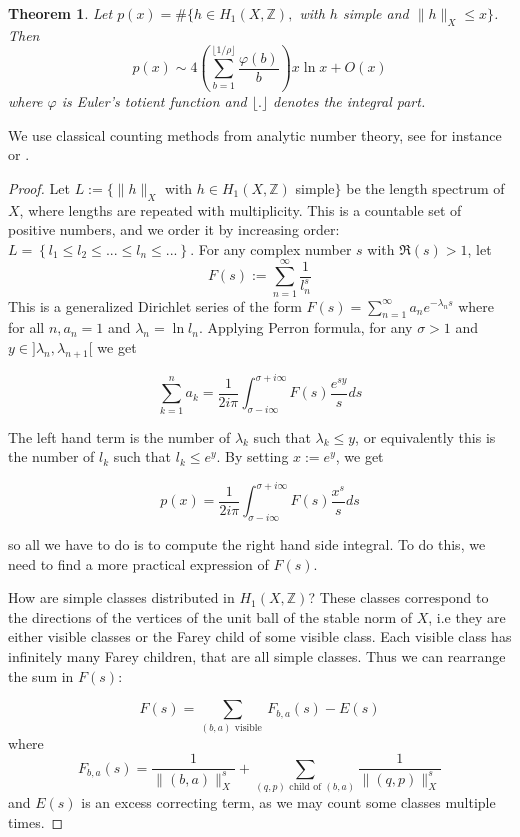\documentclass{article}
\newcommand{\ZZ}{\mathbb{Z}}
\newcommand{\St}[1]{\|#1\|_X}
\newtheorem{thm}{Theorem}[section]
\theoremstyle{definition}
\begin{document}
\begin{thm}
    Let $p(x)= \#  \{ h \in H_1(X,\ZZ),$ with $h$ simple and $\St{h}\le x \}$. Then
    $$p(x) \sim 4 \left(\sum_{b=1}^{\lfloor 1/\rho \rfloor} \frac{\varphi(b)}{b}\right )  x \ln x + O(x)$$
    where $\varphi$ is Euler's totient function and $\lfloor . \rfloor$ denotes the integral part.
\end{thm}

We use classical counting methods from analytic number theory, see for instance \cite{Apostol} or \cite{Tenenbaum}.


\begin{proof}
Let $L :=  \{ \St{h}$ with $h\in H_1(X,\ZZ)$ simple$ \}$ be the length spectrum of $X$, where lengths are repeated with multiplicity. This is a countable set of positive numbers, and we order it by increasing order: $L = \left \{ l_1 \le l_2 \le ... \le l_n \le ... \right \}$. For any complex number $s$ with $\Re(s) > 1$, let 
$$F(s):= \sum_{n=1}^\infty \frac{1}{l_n^s}$$
This is a generalized Dirichlet series of the form $F(s) = \sum\limits_{n=1}^\infty a_n e^{-\lambda_n s}$ where for all $ n, a_n = 1$ and $\lambda_n = \ln l_n$. Applying Perron formula,  for any $\sigma >1$ and $y\in ]\lambda_n, \lambda_{n+1}[$ we get

$$ \sum_{k=1}^n a_k = \frac{1}{2i\pi}\int_{\sigma-i\infty}^{\sigma+i\infty} F(s) \frac{e^{sy}}{s}ds$$

The left hand term is the number of $\lambda_k$ such that $\lambda_k \le y$, or equivalently this is the number of $l_k$ such that $l_k\le e^y$. By setting $x:= e^y$, we get

$$p(x) = \frac{1}{2i\pi}\int_{\sigma-i\infty}^{\sigma+i\infty} F(s) \frac{x^s}{s}ds$$

so all we have to do is to compute the right hand side integral. To do this, we need to find a more practical expression of $F(s)$. \newline \newline

How are simple classes distributed in $H_1(X,\ZZ)$? These classes correspond to the directions of the vertices of the unit ball of the stable norm of $X$, i.e they are either visible classes or the Farey child of some visible class. Each visible class has infinitely many Farey children, that are all simple classes. Thus we can rearrange the sum in $F(s)$:

$$ F(s) = \sum_{ (b,a) \text{ visible }} F_{b,a}(s)   - E(s)$$
where $$F_{b,a}(s) = \frac{1}{\St{(b,a)}^s} + \sum\limits_{(q,p) \text{ child of } (b,a)} \frac{1}{\St{(q,p)}^s}$$ and $E(s)$ is an excess correcting term, as we may count some classes multiple  times. \newline \newline


\end{proof}
\end{document}
